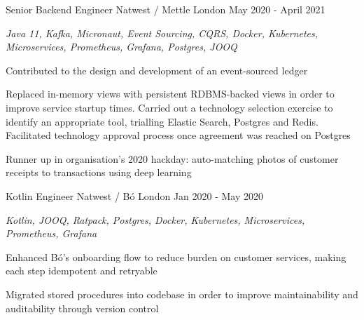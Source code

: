 \begin{cventries}
  \cventry
    {Senior Backend Engineer} %
    {Natwest / Mettle} %
    {London} %
    {May 2020 - April 2021} %
    {
      \begin{cvitems} %
        \item {\itshape{Java 11, Kafka, Micronaut, Event Sourcing, CQRS, Docker, Kubernetes, Microservices, Prometheus, Grafana, Postgres, JOOQ}}
        \item {Contributed to the design and development of an event-sourced ledger}
        \item {Replaced in-memory views with persistent RDBMS-backed views in order to improve service startup times. Carried out a technology selection exercise to identify an appropriate tool, trialling Elastic Search, Postgres and Redis. Facilitated technology approval process once agreement was reached on Postgres}
        \item {Runner up in organisation's 2020 hackday: auto-matching photos of customer receipts to transactions using deep learning}
      \end{cvitems}
    }

  \cventry
    {Kotlin Engineer} %
    {Natwest / Bó} %
    {London} %
    {Jan 2020 - May 2020} %
    {
      \begin{cvitems} %
        \item {\itshape{Kotlin, JOOQ, Ratpack, Postgres, Docker, Kubernetes, Microservices, Prometheus, Grafana}}
        \item {Enhanced Bó's onboarding flow to reduce burden on customer services, making each step idempotent and retryable}
        \item {Migrated stored procedures into codebase in order to improve maintainability and auditability through version control}
      \end{cvitems}
    }


\end{cventries}
